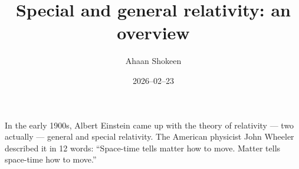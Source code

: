 \documentclass{article}
\title{Special and general relativity: an overview}
\date{2026--02--23}
\author{Ahaan Shokeen}
\begin{document}
\maketitle

In the early 1900s, Albert Einstein came up with the theory of relativity --- two actually --- general and special relativity. The American physicist John Wheeler described it in 12 words: \enquote{Space-time tells matter how to move. Matter tells space-time how to move.}
\end{document}
